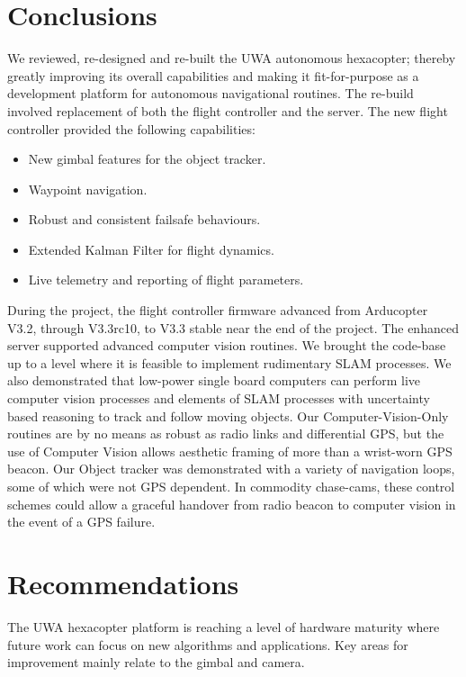 \documentclass{article}
\begin{document}
\section{Conclusions}

We reviewed, re-designed and re-built the UWA autonomous hexacopter; thereby greatly improving its overall capabilities and making it fit-for-purpose as a development platform for autonomous navigational routines. The re-build involved replacement of both the flight controller and the server. The new flight controller provided the following capabilities:
\begin{itemize}
  \item New gimbal features for the object tracker.
  \item Waypoint navigation.
  \item Robust and consistent failsafe behaviours.
  \item Extended Kalman Filter for flight dynamics.
  \item Live telemetry and reporting of flight parameters.
\end{itemize}

During the project, the flight controller firmware advanced from Arducopter V3.2, through V3.3rc10, to V3.3 stable near the end of the project.
The enhanced server supported advanced computer vision routines.
We brought the code-base up to a level where it is feasible to implement rudimentary SLAM processes. We also demonstrated that low-power single board computers can perform live computer vision processes and elements of SLAM processes with uncertainty based reasoning to track and follow moving objects. Our Computer-Vision-Only routines are by no means as robust as radio links and differential GPS, but the use of Computer Vision allows aesthetic framing of more than a wrist-worn GPS beacon. Our Object tracker was demonstrated with a variety of navigation loops, some of which were not GPS dependent. In commodity chase-cams, these control schemes could allow a graceful handover from radio beacon to computer vision in the event of a GPS failure.




\section{Recommendations}

  The UWA hexacopter platform is reaching a level of hardware maturity where future work can focus on new algorithms and applications.  Key areas for improvement mainly relate to the gimbal and camera.
\end{document}
